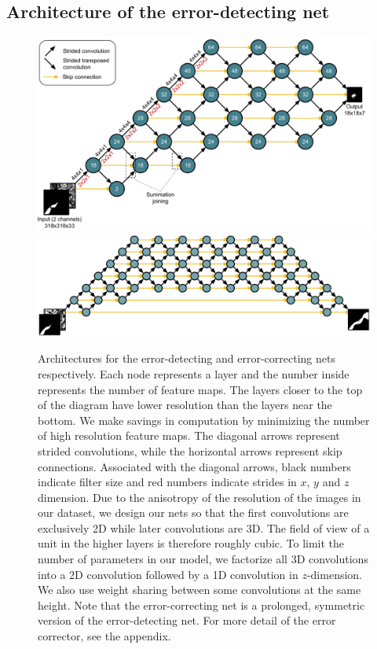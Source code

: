 \documentclass{article}
\begin{document}
\subsection{Architecture of the error-detecting net}
\begin{figure}
\centering
\includegraphics[width=1.0\linewidth]{detector.pdf}
\centering
\includegraphics[width=1.0\linewidth]{corrector2.pdf}

\caption{Architectures for the error-detecting and error-correcting nets
respectively. Each node represents a layer and the number inside represents the
number of feature maps. The layers closer to the top of the diagram have lower
resolution than the layers near the bottom. We make savings in computation by
minimizing the number of high resolution feature maps. The diagonal arrows
represent strided convolutions, while the horizontal arrows represent skip
connections. Associated with the diagonal arrows, black numbers indicate filter
size and red numbers indicate strides in $x$, $y$ and $z$ dimension. Due to the
anisotropy of the resolution of the images in our dataset, we design our nets so
that the first convolutions are exclusively 2D while later convolutions are 3D.
The field of view of a unit in the higher layers is therefore roughly cubic. To
limit the number of parameters in our model, we factorize all 3D convolutions
into a 2D convolution followed by a 1D convolution in $z$-dimension. We also use
weight sharing between some convolutions at the same height. Note that the
error-correcting net is a prolonged, symmetric version of the error-detecting
net. For more detail of the error corrector, see the appendix.}

\label{fig:architecture}
\end{figure}
\end{document}
